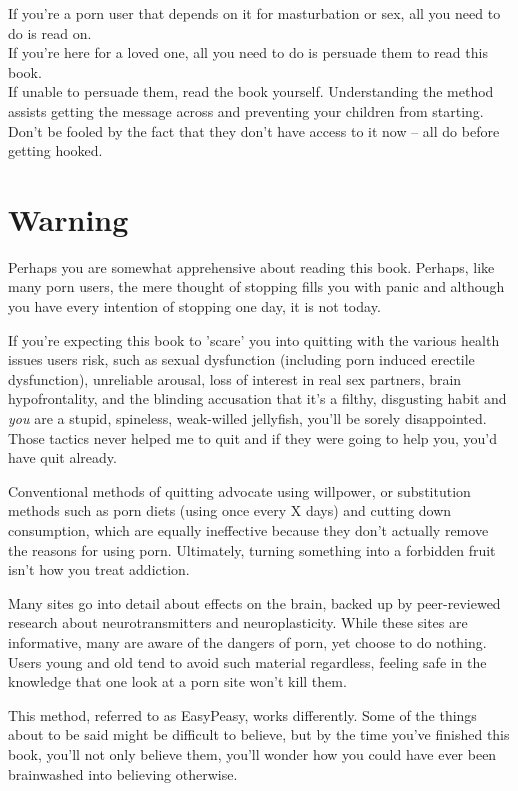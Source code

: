\documentclass[
]{book}
\begin{document}
If you're a porn user that depends on it for masturbation or sex, all you need to do is read on.\\
If you're here for a loved one, all you need to do is persuade them to read this book.\\
If unable to persuade them, read the book yourself. Understanding the method assists getting the message across and preventing your children from starting. Don't be fooled by the fact that they don't have access to it now -- all do before getting hooked.

\hypertarget{warning}{%
\section*{Warning}\label{warning}}

Perhaps you are somewhat apprehensive about reading this book. Perhaps, like many porn users, the mere thought of stopping fills you with panic and although you have every intention of stopping one day, it is not today.

If you're expecting this book to 'scare' you into quitting with the various health issues users risk, such as sexual dysfunction (including porn induced erectile dysfunction), unreliable arousal, loss of interest in real sex partners, brain hypofrontality, and the blinding accusation that it's a filthy, disgusting habit and \emph{you} are a stupid, spineless, weak-willed jellyfish, you'll be sorely disappointed. Those tactics never helped me to quit and if they were going to help you, you'd have quit already.

Conventional methods of quitting advocate using willpower, or substitution methods such as porn diets (using once every X days) and cutting down consumption, which are equally ineffective because they don't actually remove the reasons for using porn. Ultimately, turning something into a forbidden fruit isn't how you treat addiction.

Many sites go into detail about effects on the brain, backed up by peer-reviewed research about neurotransmitters and neuroplasticity. While these sites are informative, many are aware of the dangers of porn, yet choose to do nothing. Users young and old tend to avoid such material regardless, feeling safe in the knowledge that one look at a porn site won't kill them.

This method, referred to as EasyPeasy, works differently. Some of the things about to be said might be difficult to believe, but by the time you've finished this book, you'll not only believe them, you'll wonder how you could have ever been brainwashed into believing otherwise.
\end{document}
